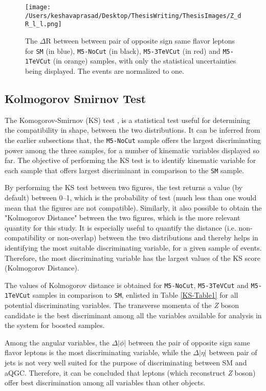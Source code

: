 	\begin{figure}[!h]%
		\centering
		\texttt{[image: /Users/keshavaprasad/Desktop/ThesisWriting/ThesisImages/Z\_dR\_l\_l.png]}
		\caption{The $\Delta \text{R}$ between between pair of opposite sign same flavor leptons for \texttt{SM} (in blue), \texttt{M5-NoCut} (in black), \texttt{M5-3TeVCut} (in red) and \texttt{M5-1TeVCut} (in orange) samples, with only the statistical uncertainties being displayed. The events are normalized to one.}
		\label{Z-dR-PostCuts}
	\end{figure}

\subsection{Kolmogorov Smirnov Test}\label{KSTest}
The Komogorov-Smirnov (KS) test \cite{KSTest}, \cite{KSTest2} is a statistical test useful for determining the compatibility in shape, between the two distributions. It can be inferred from the earlier subsections that, the \texttt{M5-NoCut} sample offers the largest discriminating power among the three samples, for a number of kinematic variables displayed so far. The objective of performing the KS test is to identify kinematic variable for each sample that offers largest discriminant in comparison to the \texttt{SM} sample. 

By performing the KS test between two figures, the test returns a value (by default) between 0--1, which is the probability of test (much less than one would mean that the figures are not compatible). Similarly, it also possible to obtain the "Kolmogorov Distance" between the two figures, which is the more relevant quantity for this study. It is especially useful to quantify the distance (i.e. non-compatibility or non-overlap) between the two distributions and thereby helps in identifying the most suitable discriminating variable, for a given sample of events. Therefore, the most discriminating variable has the largest values of the KS score (Kolmogorov Distance). 

The values of Kolmogorov distance is obtained for \texttt{M5-NoCut}, \texttt{M5-3TeVCut} and \texttt{M5-1TeVCut} samples in comparison to \texttt{SM}, enlisted in Table \ref{KS-Table1} for all potential discriminating variables. The transverse momenta of the \textit{Z} boson candidate is the best discriminant among all the variables available for analysis in the system for boosted samples. 

Among the angular variables, the $\Delta|\phi|$ between the pair of opposite sign same flavor leptons is the most discriminating variable, while the $\Delta|\eta|$ between pair of jets is not very well suited for the purpose of discriminating between SM and aQGC. Therefore, it can be concluded that leptons (which reconstruct \textit{Z} boson) offer best discrimination among all variables than other objects. 

